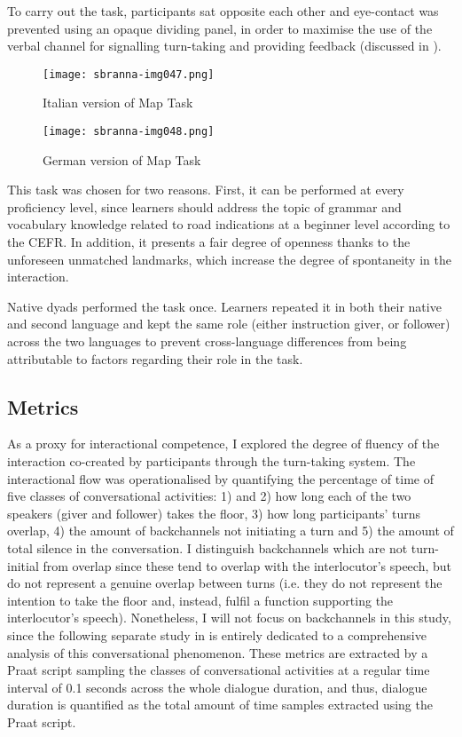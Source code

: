 To carry out the task, participants sat opposite each other and eye-contact was prevented using an opaque dividing panel, in order to maximise the use of the verbal channel for signalling turn-taking and providing feedback (discussed in ).

\begin{figure}
\texttt{[image: sbranna-img047.png]}
\caption{Italian version of Map Task}
\label{fig:3.1}
\end{figure}

\begin{figure}
\texttt{[image: sbranna-img048.png]}
\caption{German version of Map Task}
\label{fig:3.2}
\end{figure}

This task was chosen for two reasons. First, it can be performed at every proficiency level, since learners should address the topic of grammar and vocabulary knowledge related to road indications at a beginner level according to the CEFR. In addition, it presents a fair degree of openness thanks to the unforeseen unmatched landmarks, which increase the degree of spontaneity in the interaction.

Native dyads performed the task once. Learners repeated it in both their native and second language and kept the same role (either instruction giver, or follower) across the two languages to prevent cross-language differences from being attributable to factors regarding their role in the task.

\subsection{Metrics}
\label{sec:3.2.3}
As a proxy for interactional competence, I explored the degree of fluency of the interaction co-created by participants through the turn-taking system. The interactional flow was operationalised by quantifying the percentage of time of five classes of conversational activities: 1) and 2) how long each of the two speakers (giver and follower) takes the floor, 3) how long participants’ turns overlap, 4) the amount of backchannels not initiating a turn and 5) the amount of total silence in the conversation. I distinguish backchannels which are not turn-initial from overlap since these tend to overlap with the interlocutor’s speech, but do not represent a genuine overlap between turns (i.e. they do not represent the intention to take the floor and, instead, fulfil a function supporting the interlocutor’s speech). Nonetheless, I will not focus on backchannels in this study, since the following separate study in  is entirely dedicated to a comprehensive analysis of this conversational phenomenon. These metrics are extracted by a Praat script sampling the classes of conversational activities at a regular time interval of 0.1 seconds across the whole dialogue duration, and thus, dialogue duration is quantified as the total amount of time samples extracted using the Praat script.


